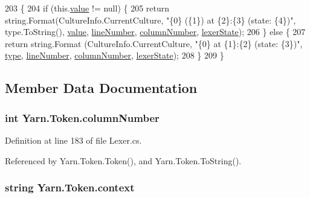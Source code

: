 \begin{DoxyCode}
203                                           \{
204             \textcolor{keywordflow}{if} (this.\hyperlink{a00173_a3df6b32d6190a639619a3f064c2154e2}{value} != null) \{
205                 \textcolor{keywordflow}{return} string.Format(CultureInfo.CurrentCulture, \textcolor{stringliteral}{"\{0\} (\{1\}) at \{2\}:\{3\} (state: \{4\})"}, 
      type.ToString(), \hyperlink{a00173_a3df6b32d6190a639619a3f064c2154e2}{value}, \hyperlink{a00173_a80fe710713201bb793a41452e314a721}{lineNumber}, \hyperlink{a00173_a9a0f0a8a7ab1e90ab48f15192323ffca}{columnNumber}, 
      \hyperlink{a00173_a710099e7abe84f30864a320cc7464214}{lexerState});
206             \} \textcolor{keywordflow}{else} \{
207                 \textcolor{keywordflow}{return} string.Format (CultureInfo.CurrentCulture, \textcolor{stringliteral}{"\{0\} at \{1\}:\{2\} (state: \{3\})"}, 
      \hyperlink{a00173_a471a25da67fda0524f2375f9a882aafa}{type}, \hyperlink{a00173_a80fe710713201bb793a41452e314a721}{lineNumber}, \hyperlink{a00173_a9a0f0a8a7ab1e90ab48f15192323ffca}{columnNumber}, \hyperlink{a00173_a710099e7abe84f30864a320cc7464214}{lexerState});
208             \}
209         \}
\end{DoxyCode}


\subsection{Member Data Documentation}
\hypertarget{a00173_a9a0f0a8a7ab1e90ab48f15192323ffca}{
\subsubsection[{column\-Number}]{\setlength{\rightskip}{0pt plus 5cm}int Yarn.\-Token.\-column\-Number}}\label{a00173_a9a0f0a8a7ab1e90ab48f15192323ffca}


Definition at line 183 of file Lexer.\-cs.



Referenced by Yarn.\-Token.\-Token(), and Yarn.\-Token.\-To\-String().

\hypertarget{a00173_a089d248c904a6e8366b81c2c47ff5af8}{
\subsubsection[{context}]{\setlength{\rightskip}{0pt plus 5cm}string Yarn.\-Token.\-context}}\label{a00173_a089d248c904a6e8366b81c2c47ff5af8}


